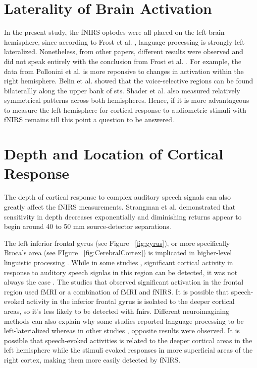 \section{Laterality of Brain Activation}
In the present study, the fNIRS optodes were all placed on the left brain hemisphere, since according to Frost et al. \citeyearpar{Frost1999-vs}, language processing is strongly left lateralized. Nonetheless, from other papers, different results were observed and did not speak entirely with the conclusion from Frost et al. \citeyearpar{Frost1999-vs}. For example, the data from Pollonini et al. \citeyearpar{Pollonini2013} is more reponsive to changes in activation within the right hemisphere. Belin et al. \citeyearpar{Belin2000} showed that the voice-selective regions can be found bilaterallly along the upper bank of \acrshort{sts}. Shader et al. \citep{Shader2021} also measured relatively symmetrical patterns across both hemispheres. Hence, if it is more advantageous to measure the left hemisphere for cortical response to audiometric stimuli with fNIRS remains till this point a question to be answered.

\section{Depth and Location of Cortical Response} %
The depth of cortical response to complex auditory speech signals can also greatly affect the fNIRS measurements. Strangman et al. \citeyearpar{Strangman2013} demonstrated that sensitivity in depth decreases exponentially and diminishing returns appear to begin around 40 to 50 mm source-detector separations.

The left inferior frontal gyrus (see Figure ~\ref{fig:gyrus}), or more specifically Broca's area (see FIgure ~\ref{fig:CerebralCortex}) is implicated in higher-level linguistic processing \citep{Belin2000}. While in some studies \citep{Wijayasir2017} \citep{Zhou2018}, significant cortical activity in response to auditory speech signlas in this region can be detected, it was not always the case \citep{Musthtaq2019}. The studies that observed significant activation in the frontal region used fMRI or a combination of fMRI and fNIRS. It is possible that speech-evoked activity in the inferior frontal gyrus is isolated to the deeper cortical areas, so it's less likely to be detected with \acrshort{fnirs}. Different neuroimagining methods can also explain why some studies \citep{Frost1999-vs} reported language processing to be left-laterialized whereas in other studies \citep{Shader2021}, opposite results were observed. It is possible that speech-evoked activities is related to the deeper cortical areas in the left hemisphere while the stimuli evoked responses in more superficial areas of the right cortex, making them more easily detected by fNIRS.

